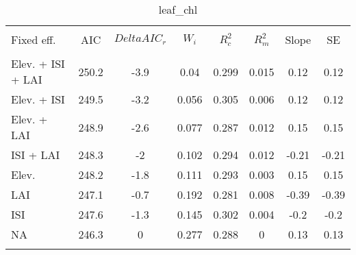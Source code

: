 
\begin{table}[!htbp] \centering 
  \caption{leaf_chl} 
  \label{leaf_chl} 
\begin{tabular}{@{\extracolsep{5pt}} lS[table-format=3.2]S[table-format=3.2]S[table-format=3.2]S[table-format=3.2]S[table-format=3.2]S[table-format=3.2]S[table-format=3.2]} 
\\[-1.8ex]\hline 
\hline \\[-1.8ex] 
{Fixed eff.} & {AIC} & {$Delta{}AIC_r$} & {$W_i$} & {$R^2_c$} & {$R^2_m$} & {Slope} & {SE} \\
\hline \\[-1.8ex] 
Elev. + ISI + LAI & 250.2 & -3.9 & 0.04 & 0.299 & 0.015 & 0.12 & 0.12 \\ 
Elev. + ISI & 249.5 & -3.2 & 0.056 & 0.305 & 0.006 & 0.12 & 0.12 \\ 
Elev. + LAI & 248.9 & -2.6 & 0.077 & 0.287 & 0.012 & 0.15 & 0.15 \\ 
ISI + LAI & 248.3 & -2 & 0.102 & 0.294 & 0.012 & -0.21 & -0.21 \\ 
Elev. & 248.2 & -1.8 & 0.111 & 0.293 & 0.003 & 0.15 & 0.15 \\ 
LAI & 247.1 & -0.7 & 0.192 & 0.281 & 0.008 & -0.39 & -0.39 \\ 
ISI & 247.6 & -1.3 & 0.145 & 0.302 & 0.004 & -0.2 & -0.2 \\ 
NA & 246.3 & 0 & 0.277 & 0.288 & 0 & 0.13 & 0.13 \\ 
\hline \\[-1.8ex] 
\end{tabular} 
\end{table} 
